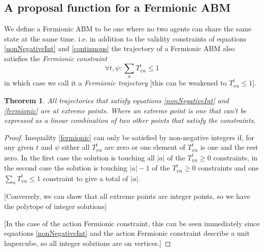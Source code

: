 \documentclass{article}
\newtheorem{theorem}{Theorem}
\begin{document}
\subsection{A proposal function for a Fermionic ABM}

We define a Fermionic ABM to be one where no two agents can share the same state at the same time. i.e. in addition to the validity constraints of equations \ref{nonNegativeInt} and \ref{continuous} the trajectory of a Fermionic ABM also satisfies the \textit{Fermionic constraint}
\begin{equation}
\forall t,\psi: \sum_a T^t_{\psi a} \le 1
\label{fermionic}
\end{equation}
in which case we call it a \textit{Fermionic trajectory} [this can be weakened to $T^t_{\psi a} \le 1$].

\begin{theorem}
All trajectories that satisfy equations \ref{nonNegativeInt} and \ref{fermionic} are at extreme points. Where an extreme point is one that can't be expressed as a linear combination of two other points that satisfy the constraints.
\end{theorem}
\begin{proof}

Inequality \ref{fermionic} can only be satisfied by non-negative integers if, for any given $t$ and $\psi$ either all $T^t_{\psi a}$ are zero or one element of $T^t_{\psi a}$ is one and the rest zero. In the first case the solution is touching all $|a|$ of the $T^t_{\psi a} \ge 0$ constraints, in the second case the solution is touching $|a|-1$ of the $T^t_{\psi a} \ge 0$ constraints and one $\sum_a T^t_{\psi a} \le 1$ constraint to give a total of $|a|$.

[Conversely, we can show that all extreme points are integer points, so we have the polytope of integer solutions]

[In the case of the action Fermionic constraint, this can be seen immediately since equations \ref{nonNegativeInt} and the action Fermionic constraint describe a unit hupercube, so all integer solutions are on vertices.]

\end{proof}

\end{document}
